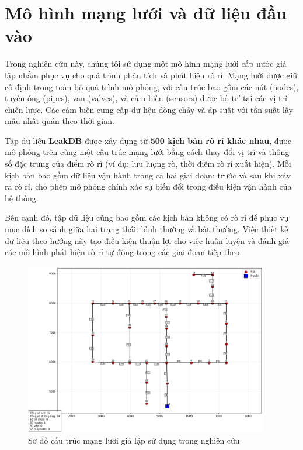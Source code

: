 \section{Mô hình mạng lưới và dữ liệu đầu vào}

Trong nghiên cứu này, chúng tôi sử dụng một mô hình mạng lưới cấp nước giả lập nhằm phục vụ cho quá trình phân tích và phát hiện rò rỉ. Mạng lưới được giữ cố định trong toàn bộ quá trình mô phỏng, với cấu trúc bao gồm các nút (nodes), tuyến ống (pipes), van (valves), và cảm biến (sensors) được bố trí tại các vị trí chiến lược. Các cảm biến cung cấp dữ liệu dòng chảy và áp suất với tần suất lấy mẫu nhất quán theo thời gian.

Tập dữ liệu \textbf{LeakDB} được xây dựng từ \textbf{500 kịch bản rò rỉ khác nhau}, được mô phỏng trên cùng một cấu trúc mạng lưới bằng cách thay đổi vị trí và thông số đặc trưng của điểm rò rỉ (ví dụ: lưu lượng rò, thời điểm rò rỉ xuất hiện). Mỗi kịch bản bao gồm dữ liệu vận hành trong cả hai giai đoạn: trước và sau khi xảy ra rò rỉ, cho phép mô phỏng chính xác sự biến đổi trong điều kiện vận hành của hệ thống.

Bên cạnh đó, tập dữ liệu cũng bao gồm các kịch bản không có rò rỉ để phục vụ mục đích so sánh giữa hai trạng thái: bình thường và bất thường. Việc thiết kế dữ liệu theo hướng này tạo điều kiện thuận lợi cho việc huấn luyện và đánh giá các mô hình phát hiện rò rỉ tự động trong các giai đoạn tiếp theo.

\begin{figure}[htbp]
    \centering
    \includegraphics[width=0.95\textwidth]{image/section5_3/hanoi_network.png}
    \caption{Sơ đồ cấu trúc mạng lưới giả lập sử dụng trong nghiên cứu}
    \label{fig:network_diagram}
\end{figure}

